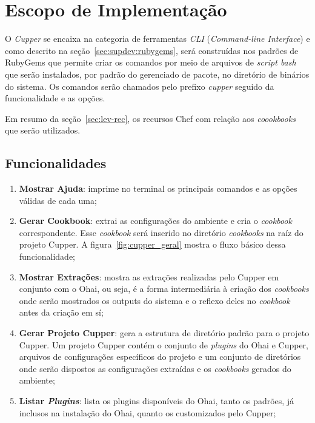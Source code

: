 \section{Escopo de Implementação}
\label{sec:escopo}

O \textit{Cupper} se encaixa na categoria de ferramentas \textit{CLI} (\textit{Command-line Interface})
e como descrito na seção~\ref{sec:supdev:rubygems}, será construídas nos padrões de
RubyGems que permite criar os comandos por meio de arquivos de \textit{script bash}
que serão instalados, por padrão do gerenciado de pacote, no diretório de binários do sistema.
Os comandos serão chamados pelo prefixo \textit{cupper} seguido da funcionalidade e as opções.


Em resumo da seção~\ref{sec:lev-rec}, os recursos Chef com relação aos \textit{coookbooks} que serão utilizados.

\subsection{Funcionalidades}

\begin{enumerate}
  \item \textbf{Mostrar Ajuda}: imprime no terminal os principais comandos e as opções válidas de
    cada uma;

  \item \textbf{Gerar Cookbook}: extrai as configurações do ambiente e cria o \textit{cookbook} correspondente.
    Esse \textit{cookbook} será inserido no diretório \textit{cookbooks} na raíz do projeto Cupper.
    A figura~\ref{fig:cupper_geral} mostra o fluxo básico dessa funcionalidade;

  \item \textbf{Mostrar Extrações}: mostra as extrações realizadas pelo Cupper em conjunto com o Ohai,
    ou seja, é a forma intermediária à criação dos \textit{cookbooks} onde serão mostrados os outputs do
    sistema e o reflexo deles no \textit{cookbook} antes da criação em sí;

  \item \textbf{Gerar Projeto Cupper}: gera a estrutura de diretório padrão para o projeto Cupper.
    Um projeto Cupper contém o conjunto de \textit{plugins} do Ohai e Cupper, arquivos de configurações
    específicos do projeto e um conjunto de diretórios onde serão dispostos as configurações
    extraídas e os \textit{cookbooks} gerados do ambiente;

  \item \textbf{Listar \textit{Plugins}}: lista os plugins disponíveis do Ohai, tanto os padrões, já inclusos
    na instalação do Ohai, quanto os customizados pelo Cupper;

\end{enumerate}

